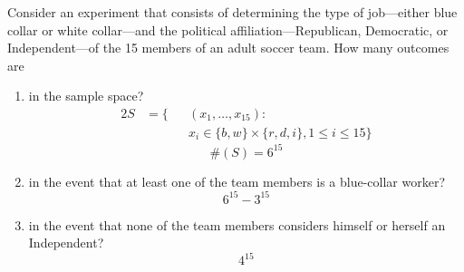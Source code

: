 \item  Consider an experiment that consists of determining the type of job—either blue collar or white collar—and the political affiliation—Republican, Democratic, or Independent—of the 15 members of an adult soccer team. How many outcomes are
\begin{enumerate}
    \item in the sample space?
    \begin{alignat*}{2}
        S &= \{&&(x_1,\dots,x_{15}) :\\
        &&&x_i \in \{b, w\} \times \{r, d, i\}, 1 \le i \le 15 \}
    \end{alignat*}
    \[ \#(S) = 6^{15} \]
    \item in the event that at least one of the team members is a blue-collar worker?
    \[ 6^{15} - 3^{15} \]
    \item in the event that none of the team members considers himself or herself an Independent?
    \[ 4^{15} \]
\end{enumerate}